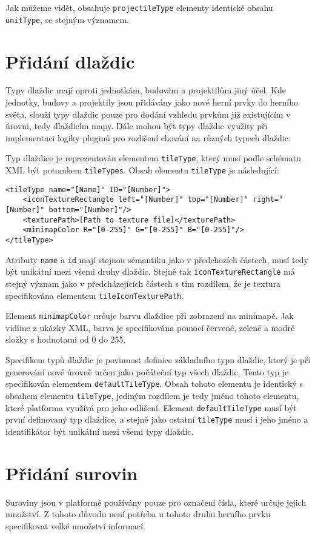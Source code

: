 Jak můžeme vidět, obsahuje \texttt{projectileType} elementy identické obsahu \texttt{unitType}, se stejným významem.


\section{Přidání dlaždic}
Typy dlaždic mají oproti jednotkám, budovám a projektilům jiný účel. Kde jednotky, budovy a projektily jsou přidávány jako nové herní prvky do herního světa, slouží typy dlaždic pouze pro dodání vzhledu prvkům již existujícím v úrovni, tedy dlaždicím mapy. Dále mohou být typy dlaždic využity při implementaci logiky pluginů pro rozlišení chování na různých typech dlaždic.

Typ dlaždice je reprezentován elementem \texttt{tileType}, který musí podle schématu XML být potomkem \texttt{tileTypes}. Obsah elementu \texttt{tileType} je následující:
\begin{lstlisting}
<tileType name="[Name]" ID="[Number]">
	<iconTextureRectangle left="[Number]" top="[Number]" right="[Number]" bottom="[Number]"/>
	<texturePath>[Path to texture file]</texturePath>
	<minimapColor R="[0-255]" G="[0-255]" B="[0-255]"/>
</tileType>
\end{lstlisting}

Atributy \texttt{name} a \texttt{id} mají stejnou sémantiku jako v předchozích částech, musí tedy být unikátní mezi všemi druhy dlaždic. Stejně tak \texttt{iconTextureRectangle} má stejný význam jako v předcházejících částech s tím rozdílem, že je textura specifikována elementem \texttt{tileIconTexturePath}.

Element \texttt{minimapColor} určuje barvu dlaždice při zobrazení na minimapě. Jak vidíme z ukázky XML, barva je specifikována pomocí červené, zelené a modré složky s hodnotami od 0 do 255.

Specifikem typů dlaždic je povinnost definice základního typu dlaždic, který je při generování nové úrovně určen jako počáteční typ všech dlaždic. Tento typ je specifikován elementem \texttt{defaultTileType}. Obsah tohoto elementu je identický s obsahem elementu \texttt{tileType}, jediným rozdílem je tedy jméno tohoto elementu, které platforma využívá pro jeho odlišení. Element \texttt{defaultTileType} musí být první definovaný typ dlaždice, a stejně jako ostatní \texttt{tileType} musí i jeho jméno a identifikátor být unikátní mezi všemi typy dlaždic.

\section{Přidání surovin}
Suroviny jsou v platformě používány pouze pro označení čísla, které určuje jejich množství. Z tohoto důvodu není potřeba u tohoto druhu herního prvku specifikovat velké množství informací.

